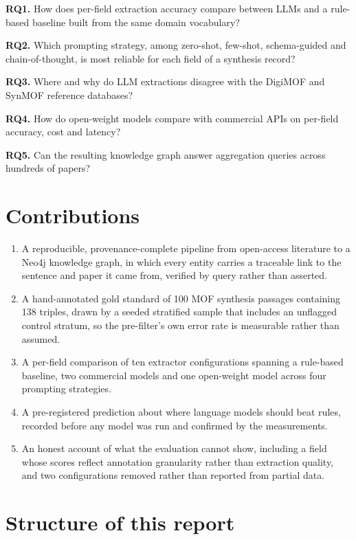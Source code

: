 \documentclass[11pt,a4paper,oneside]{report}
\begin{document}
\textbf{RQ1.} How does per-field extraction accuracy compare between LLMs and a rule-based baseline built from the same domain vocabulary?

\textbf{RQ2.} Which prompting strategy, among zero-shot, few-shot, schema-guided and chain-of-thought, is most reliable for each field of a synthesis record?

\textbf{RQ3.} Where and why do LLM extractions disagree with the DigiMOF and SynMOF reference databases?

\textbf{RQ4.} How do open-weight models compare with commercial APIs on per-field accuracy, cost and latency?

\textbf{RQ5.} Can the resulting knowledge graph answer aggregation queries across hundreds of papers?

\section{Contributions}

\begin{enumerate}
\item A reproducible, provenance-complete pipeline from open-access literature to a Neo4j knowledge graph, in which every entity carries a traceable link to the sentence and paper it came from, verified by query rather than asserted.
\item A hand-annotated gold standard of 100 MOF synthesis passages containing 138 triples, drawn by a seeded stratified sample that includes an unflagged control stratum, so the pre-filter's own error rate is measurable rather than assumed.
\item A per-field comparison of ten extractor configurations spanning a rule-based baseline, two commercial models and one open-weight model across four prompting strategies.
\item A pre-registered prediction about where language models should beat rules, recorded before any model was run and confirmed by the measurements.
\item An honest account of what the evaluation cannot show, including a field whose scores reflect annotation granularity rather than extraction quality, and two configurations removed rather than reported from partial data.
\end{enumerate}
\section{Structure of this report}
\end{document}
